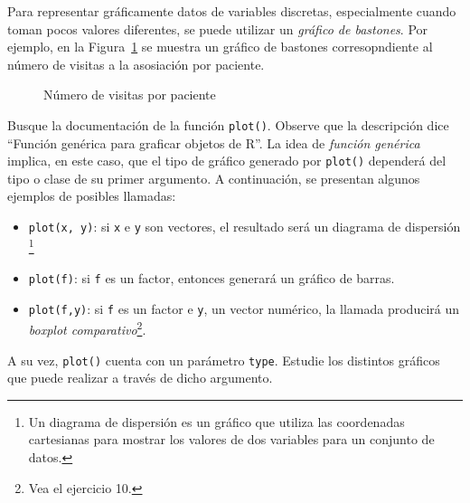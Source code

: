 \documentclass{prob}
\begin{document}
	\begin{problema}
	Para representar gráficamente datos de variables discretas, especialmente cuando toman pocos valores diferentes, se puede utilizar un \textit{gráfico de bastones}. Por ejemplo, en la Figura~\ref{fig:bast} se muestra un gráfico de bastones corresopndiente al número de visitas a la asosiación por paciente. 

\begin{figure}[!ht]
    \centering
    
    \caption{Número de visitas por paciente}
    \label{fig:bast}
\end{figure}		
	
	\begin{parte}
	Busque la documentación de la función \texttt{plot()}. Observe que la descripción dice \textquotedblleft Función genérica para graficar objetos de R\textquotedblright . La idea de \textit{función genérica} implica, en este caso, que el tipo de gráfico generado por \texttt{plot()} dependerá del tipo o clase de su primer argumento. A continuación, se presentan algunos ejemplos de posibles llamadas:
	\begin{itemize}
	\item \texttt{plot(x, y)}: si \texttt{x} e \texttt{y} son vectores, el resultado será un diagrama de dispersión \footnote{Un diagrama de dispersión es un gráfico que utiliza las coordenadas cartesianas para mostrar los valores de dos variables para un conjunto de datos.}
	\item \texttt{plot(f)}: si \texttt{f} es un factor, entonces generará un gráfico de barras.
	\item \texttt{plot(f,y)}: si \texttt{f} es un factor e \texttt{y}, un vector numérico, la llamada producirá un \textit{boxplot comparativo}\footnote{Vea el ejercicio 10.}.
	\end{itemize}		
	A su vez, \texttt{plot()} cuenta con un parámetro \texttt{type}. Estudie los distintos gráficos que puede realizar a través de dicho argumento.
	\end{parte}
	

\end{problema}
\end{document}
